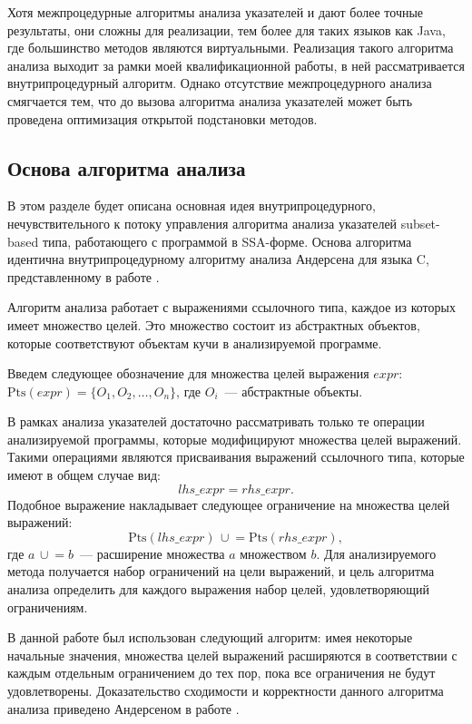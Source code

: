 \documentclass[14pt,titlepage]{extarticle}
\newcommand{\Pts}[1]{\textrm{Pts}(#1)}
\newcommand{\cupe}{\,\cup\!\!=}
\newcommand{\eng}[1]{{\English#1}}
\begin{document}
        Хотя межпроцедурные алгоритмы анализа указателей и дают более точные
        результаты, они сложны для реализации, тем более для таких
        языков как Java, где большинство методов являются виртуальными.
        Реализация такого алгоритма анализа выходит за рамки моей
        квалификационной работы, в ней рассматривается внутрипроцедурный
        алгоритм. Однако отсутствие межпроцедурного анализа смягчается тем, что
        до вызова алгоритма анализа указателей может быть проведена
        оптимизация открытой подстановки методов.

    \subsection{Основа алгоритма анализа}
      \label{section:algorithm_basis}

      В этом разделе будет описана основная идея внутрипроцедурного,
      нечувствительного к потоку управления алгоритма анализа указателей
      \eng{subset-based} типа, работающего с программой в SSA-форме. Основа
      алгоритма идентична внутрипроцедурному алгоритму анализа Андерсена для
      языка C, представленному в работе \cite{andersen}.

      Алгоритм анализа работает с выражениями ссылочного типа, каждое из
      которых имеет множество целей. Это множество состоит из абстрактных
      объектов, которые соответствуют объектам кучи в анализируемой программе.

      Введем следующее обозначение для множества целей выражения $expr$:
      $\Pts{expr} = \{O_1, O_2, \ldots, O_n\}$, где $O_i$~--- абстрактные объекты.

      В рамках анализа указателей достаточно рассматривать только те операции
      анализируемой программы, которые модифицируют множества целей выражений.
      Такими операциями являются присваивания выражений ссылочного типа,
      которые имеют в общем случае вид:
      \[lhs\_expr = rhs\_expr.\]
      Подобное выражение накладывает следующее ограничение на множества целей
      выражений:
      \[\Pts{lhs\_expr} \cupe \Pts{rhs\_expr},\]
      где $a \cupe b$~--- расширение множества $a$ множеством $b$.
      Для анализируемого метода получается набор ограничений на цели выражений,
      и цель алгоритма анализа определить для каждого выражения набор целей,
      удовлетворяющий ограничениям.

      В данной работе был использован следующий алгоритм: имея некоторые
      начальные значения, множества целей выражений расширяются в соответствии
      с каждым отдельным ограничением до тех пор, пока все ограничения не будут
      удовлетворены. Доказательство сходимости и корректности данного алгоритма
      анализа приведено Андерсеном в работе \cite{andersen}.
\end{document}
